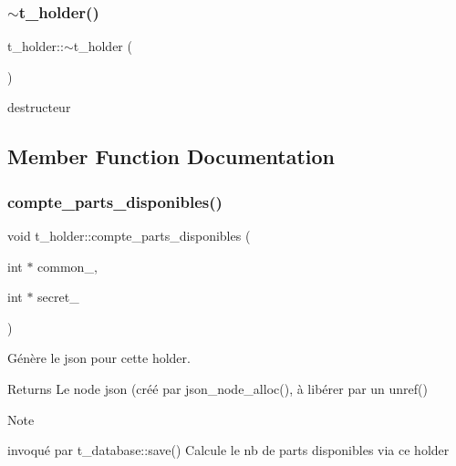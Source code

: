 \subsubsection{\texorpdfstring{$\sim$t\+\_\+holder()}{~t\_holder()}}
{\footnotesize\ttfamily t\+\_\+holder\+::$\sim$t\+\_\+holder (\begin{DoxyParamCaption}{ }\end{DoxyParamCaption})}

destructeur 

\subsection{Member Function Documentation}
\mbox{\label{classt__holder_ace602439e9c0675405f0bf6d6d46157f}} 
\subsubsection{\texorpdfstring{compte\+\_\+parts\+\_\+disponibles()}{compte\_parts\_disponibles()}}
{\footnotesize\ttfamily void t\+\_\+holder\+::compte\+\_\+parts\+\_\+disponibles (\begin{DoxyParamCaption}\item[{int $\ast$}]{common\+\_\+,  }\item[{int $\ast$}]{secret\+\_\+ }\end{DoxyParamCaption})}



Génère le json pour cette holder. 

\begin{DoxyReturn}{Returns}
Le node json (créé par json\+\_\+node\+\_\+alloc(), à libérer par un unref() 
\end{DoxyReturn}
\begin{DoxyNote}{Note}

\begin{DoxyItemize}
\item invoqué par t\+\_\+database\+::save() Calcule le nb de parts disponibles via ce holder 
\end{DoxyItemize}
\end{DoxyNote}

